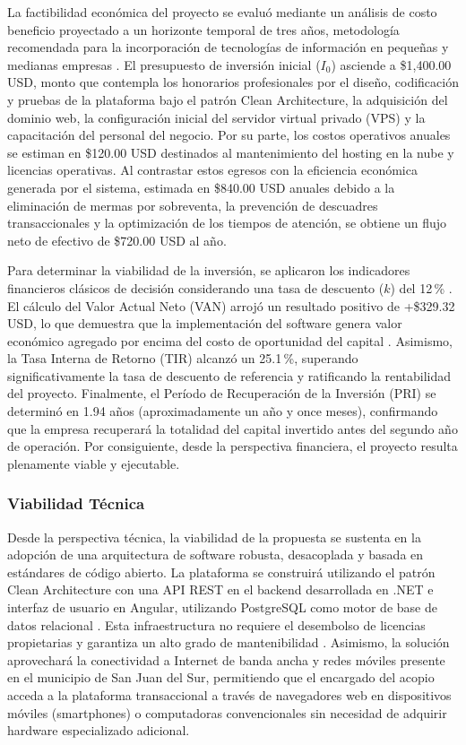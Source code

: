 La factibilidad económica del proyecto se evaluó mediante un análisis de costo beneficio proyectado a un horizonte temporal de tres años, metodología recomendada para la incorporación de tecnologías de información en pequeñas y medianas empresas \parencite{kendall2014,maldonado2021}. El presupuesto de inversión inicial ($I_{0}$) asciende a \$1,400.00 USD, monto que contempla los honorarios profesionales por el diseño, codificación y pruebas de la plataforma bajo el patrón Clean Architecture, la adquisición del dominio web, la configuración inicial del servidor virtual privado (VPS) y la capacitación del personal del negocio. Por su parte, los costos operativos anuales se estiman en \$120.00 USD destinados al mantenimiento del hosting en la nube y licencias operativas. Al contrastar estos egresos con la eficiencia económica generada por el sistema, estimada en \$840.00 USD anuales debido a la eliminación de mermas por sobreventa, la prevención de descuadres transaccionales y la optimización de los tiempos de atención, se obtiene un flujo neto de efectivo de \$720.00 USD al año.

Para determinar la viabilidad de la inversión, se aplicaron los indicadores financieros clásicos de decisión considerando una tasa de descuento ($k$) del 12\,\% \parencite{lledo2007}. El cálculo del Valor Actual Neto (VAN) arrojó un resultado positivo de +\$329.32 USD, lo que demuestra que la implementación del software genera valor económico agregado por encima del costo de oportunidad del capital \parencite{burneoValarezo2016}. Asimismo, la Tasa Interna de Retorno (TIR) alcanzó un 25.1\,\%, superando significativamente la tasa de descuento de referencia y ratificando la rentabilidad del proyecto. Finalmente, el Período de Recuperación de la Inversión (PRI) se determinó en 1.94 años (aproximadamente un año y once meses), confirmando que la empresa recuperará la totalidad del capital invertido antes del segundo año de operación. Por consiguiente, desde la perspectiva financiera, el proyecto resulta plenamente viable y ejecutable.

\subsubsection{Viabilidad Técnica}

Desde la perspectiva técnica, la viabilidad de la propuesta se sustenta en la adopción de una arquitectura de software robusta, desacoplada y basada en estándares de código abierto. La plataforma se construirá utilizando el patrón Clean Architecture con una API REST en el backend desarrollada en .NET e interfaz de usuario en Angular, utilizando PostgreSQL como motor de base de datos relacional \parencite{elmasri2020,villasmil2021}. Esta infraestructura no requiere el desembolso de licencias propietarias y garantiza un alto grado de mantenibilidad \parencite{sommerville2019}. Asimismo, la solución aprovechará la conectividad a Internet de banda ancha y redes móviles presente en el municipio de San Juan del Sur, permitiendo que el encargado del acopio acceda a la plataforma transaccional a través de navegadores web en dispositivos móviles (smartphones) o computadoras convencionales sin necesidad de adquirir hardware especializado adicional.

